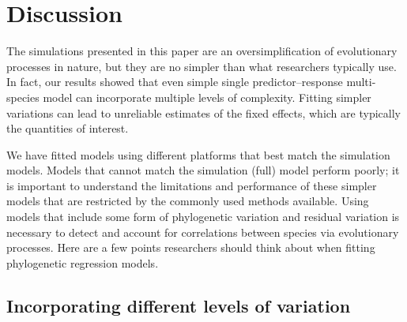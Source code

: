 \documentclass[12pt]{article}
\begin{document}

\newpage

\section*{Discussion}



The simulations presented in this paper are an oversimplification of evolutionary processes in nature, but they are no simpler than what researchers typically use.
In fact, our results showed that even simple single predictor--response multi-species model can incorporate multiple levels of complexity.  
Fitting simpler variations can lead to unreliable estimates of the fixed effects, which are typically the quantities of interest.

We have fitted models using different platforms that best match the simulation models. 
Models that cannot match the simulation (full) model perform poorly; it is important to understand the limitations and performance of these simpler models that are restricted by the commonly used methods available.
Using models that include some form of phylogenetic variation and residual variation is necessary to detect and account for correlations between species via evolutionary processes.
Here are a few points researchers should think about when fitting phylogenetic regression models.

\subsection*{Incorporating different levels of variation}

\end{document}
